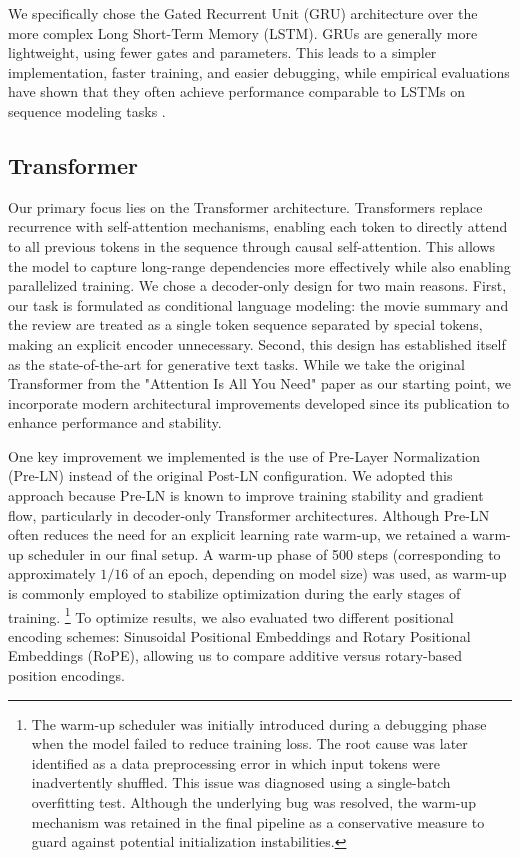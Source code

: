 We specifically chose the Gated Recurrent Unit (GRU) architecture over the more complex Long Short-Term Memory (LSTM).
GRUs are generally more lightweight, using fewer gates and parameters.
This leads to a simpler implementation, faster training, and easier debugging, while empirical evaluations have shown that they often achieve performance comparable to LSTMs on sequence modeling tasks \cite{chung2014}.


\subsection{Transformer} \label{subsec:transformer}
Our primary focus lies on the Transformer architecture.
Transformers replace recurrence with self-attention mechanisms, enabling each token to directly attend to all previous tokens in the sequence through causal self-attention.
This allows the model to capture long-range dependencies more effectively while also enabling parallelized training.
We chose a decoder-only design for two main reasons.
First, our task is formulated as conditional language modeling: the movie summary and the review are treated as a single token sequence separated by special tokens, making an explicit encoder unnecessary.
Second, this design has established itself as the state-of-the-art for generative text tasks.
While we take the original Transformer from the "Attention Is All You Need" paper \cite{attention} as our starting point, we incorporate modern architectural improvements developed since its publication to enhance performance and stability.

One key improvement we implemented is the use of Pre-Layer Normalization (Pre-LN) instead of the original Post-LN configuration.
We adopted this approach because Pre-LN is known to improve training stability and gradient flow, particularly in decoder-only Transformer architectures.
Although Pre-LN often reduces the need for an explicit learning rate warm-up, we retained a warm-up scheduler in our final setup.
A warm-up phase of 500 steps (corresponding to approximately $1/16$ of an epoch, depending on model size) was used, as warm-up is commonly employed to stabilize optimization during the early stages of training. 
\footnote{The warm-up scheduler was initially introduced during a debugging phase when the model failed to reduce training loss.
The root cause was later identified as a data preprocessing error in which input tokens were inadvertently shuffled.
This issue was diagnosed using a single-batch overfitting test.
Although the underlying bug was resolved, the warm-up mechanism was retained in the final pipeline as a conservative measure to guard against potential initialization instabilities.}
To optimize results, we also evaluated two different positional encoding schemes: Sinusoidal Positional Embeddings and Rotary Positional Embeddings (RoPE), allowing us to compare additive versus rotary-based position encodings.


